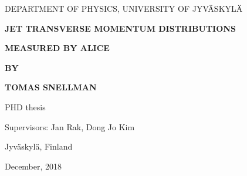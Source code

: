 
\vspace*{10mm}

\centerline{DEPARTMENT OF PHYSICS, UNIVERSITY OF JYV\"ASKYL\"A}

\vspace{25mm} 

\centerline{\bf JET TRANSVERSE MOMENTUM DISTRIBUTIONS }
\centerline{\bf MEASURED BY ALICE }
\centerline{\bf }

\vspace{13mm}


\centerline{\bf BY}
\centerline{\bf TOMAS SNELLMAN}

\vspace{13mm}

\centerline{PHD thesis}


\vspace{13mm}



\vspace{0mm}



\centerline{Supervisors: Jan Rak, Dong Jo Kim}
\vspace{13mm}

\centerline{Jyv\"askyl\"a, Finland}
\centerline{December, 2018}


\pagebreak








